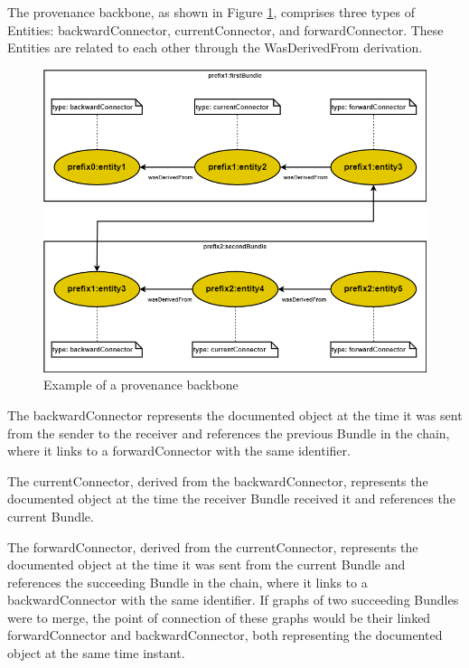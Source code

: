 \documentclass[
  digital,     %
  oneside,     %
  nosansbold,  %
  nocolorbold, %
  lof,         %
  lot,         %
]{fithesis4}
\begin{document}
The provenance backbone, as shown in Figure \ref{fig:bundleconnection}, comprises three types of Entities: backwardConnector, currentConnector, and forwardConnector. These Entities are related to each other through the WasDerivedFrom derivation.  

\begin{figure}[htbp]
  \begin{center}
    \includegraphics[width=12.5cm]{fithesis/images/backbone.png}
  \end{center}
  \caption{Example of a provenance backbone}
  \label{fig:bundleconnection}
\end{figure}

The backwardConnector represents the documented object at the time it was sent from the sender to the receiver and references the previous Bundle in the chain, where it links to a forwardConnector with the same identifier.

The currentConnector, derived from the backwardConnector, represents the documented object at the time the receiver Bundle received it and references the current Bundle.

The forwardConnector, derived from the currentConnector, represents the documented object at the time it was sent from the current Bundle and references the succeeding Bundle in the chain, where it links to a backwardConnector with the same identifier. If graphs of two succeeding Bundles were to merge, the point of connection of these graphs would be their linked forwardConnector and backwardConnector, both representing the documented object at the same time instant.
\end{document}
